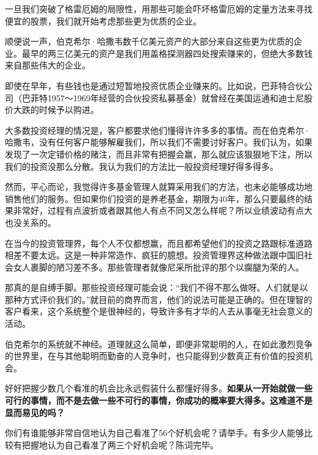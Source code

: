 一旦我们突破了格雷厄姆的局限性，用那些可能会吓坏格雷厄姆的定量方法来寻找便宜的股票，我们就开始考虑那些更为优质的企业。
\par

顺便说一声，伯克希尔·哈撒韦数千亿美元资产的大部分来自这些更为优质的企业。最早的两三亿美元的资产是我们用盖格探测器四处搜索赚来的，但绝大多数钱来自那些伟大的企业。
\par

即使在早年，有些钱也是通过短暂地投资优质企业赚来的。比如说，巴菲特合伙公司（巴菲特1957～1969年经营的合伙投资私募基金）就曾经在美国运通和迪士尼股价大跌的时候予以购进。
\par

大多数投资经理的情况是，客户都要求他们懂得许许多多的事情。而在伯克希尔·哈撒韦，没有任何客户能够解雇我们，所以我们不需要讨好客户。我们认为，如果发现了一次定错价格的赌注，而且非常有把握会赢，那么就应该狠狠地下注，所以我们的投资没那么分散。我认为我们的方法比一般投资经理好得多得多。
\par

然而，平心而论，我觉得许多基金管理人就算采用我们的方法，也未必能够成功地销售他们的服务。但如果你们投资的是养老基金，期限为40年，那么只要最终的结果非常好，过程有点波折或者跟其他人有点不同又怎么样呢？所以业绩波动有点大也没关系的。
\par

在当今的投资管理界，每个人不仅都想赢，而且都希望他们的投资之路跟标准道路相差不要太远。这是一种非常造作、疯狂的臆想。投资管理界这种做法跟中国旧社会女人裹脚的陋习差不多。那些管理者就像尼采所批评的那个以瘸腿为荣的人。
\par

那真的是自缚手脚。那些投资经理可能会说：“我们不得不那么做呀。人们就是以那种方式评价我们的。”就目前的商界而言，他们的说法可能是正确的。但在理智的客户看来，这个系统整个是很神经的，导致许多有才华的人去从事毫无社会意义的活动。
\par

伯克希尔的系统就不神经。道理就这么简单，即便非常聪明的人，在如此激烈竞争的世界里，在与其他聪明而勤奋的人竞争时，也只能得到少数真正有价值的投资机会。
\par

好好把握少数几个看准的机会比永远假装什么都懂好得多。\textbf{如果从一开始就做一些可行的事情，而不是去做一些不可行的事情，你成功的概率要大得多。这难道不是显而易见的吗？}
\par

你们有谁能够非常自信地认为自己看准了56个好机会呢？请举手。有多少人能够比较有把握地认为自己看准了两三个好机会呢？陈词完毕。
\par

